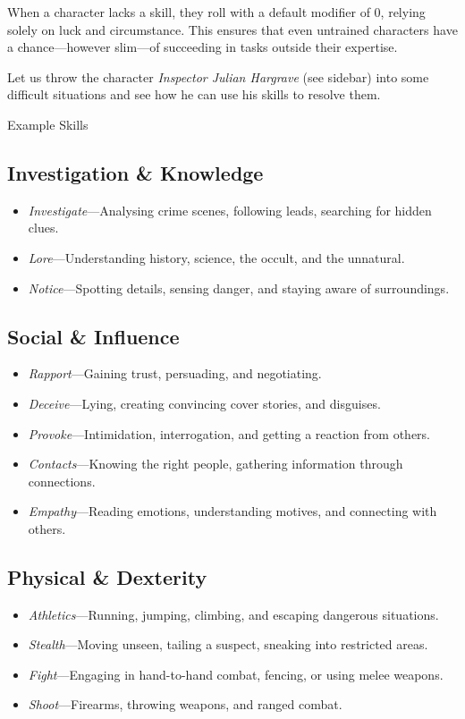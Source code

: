 When a character lacks a skill, they roll with a default modifier of 0, relying solely on luck and circumstance. This ensures that even untrained characters have a chance—however slim—of succeeding in tasks outside their expertise.

Let us throw the character \emph{Inspector Julian Hargrave} (see sidebar) into some difficult situations and see how he can use his skills to resolve them.

\clearpage
{}

\begin{WyrdExampleSidebar}[float=!t]{Example Skills}
	\subsection*{Investigation \& Knowledge}  
	\begin{itemize}
    	\item \emph{Investigate}---Analysing crime scenes, following leads, searching for hidden clues.
	    \item \emph{Lore}---Understanding history, science, the occult, and the unnatural.
	    \item \emph{Notice}---Spotting details, sensing danger, and staying aware of surroundings.
	\end{itemize}

	\subsection*{Social \& Influence}  
	\begin{itemize}
    	\item \emph{Rapport}---Gaining trust, persuading, and negotiating.
	    \item \emph{Deceive}---Lying, creating convincing cover stories, and disguises.
    	\item \emph{Provoke}---Intimidation, interrogation, and getting a reaction from others.
	    \item \emph{Contacts}---Knowing the right people, gathering information through connections.
		\item \emph{Empathy}---Reading emotions, understanding motives, and connecting with others.
	\end{itemize}

	\subsection*{Physical \& Dexterity}  
	\begin{itemize}
    	\item \emph{Athletics}---Running, jumping, climbing, and escaping dangerous situations.
	    \item \emph{Stealth}---Moving unseen, tailing a suspect, sneaking into restricted areas.
	    \item \emph{Fight}---Engaging in hand-to-hand combat, fencing, or using melee weapons.
	    \item \emph{Shoot}---Firearms, throwing weapons, and ranged combat.
	\end{itemize}


\end{WyrdExampleSidebar}
